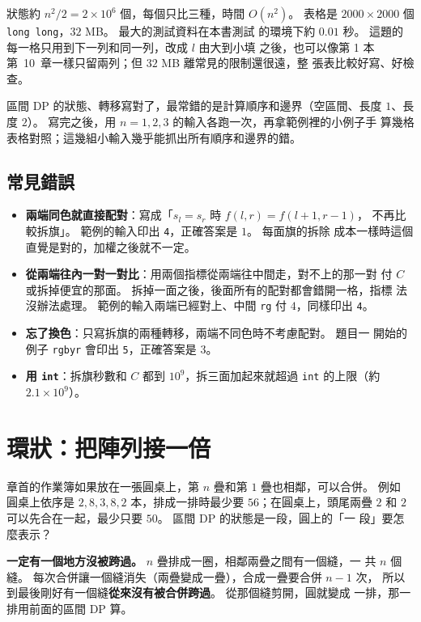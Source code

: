 狀態約 $n^2/2 = 2 \times 10^6$ 個，每個只比三種，時間 $O(n^2)$。 表格是
$2000 \times 2000$ 個 \texttt{long long}，$32$ MB。 最大的測試資料在本書測試
的環境下約 $0.01$ 秒。 這題的每一格只用到下一列和同一列，改成 $l$ 由大到小填
之後，也可以像第 1 本第~10~章一樣只留兩列；但 $32$ MB 離常見的限制還很遠，整
張表比較好寫、好檢查。

\begin{apcsnote}
區間 DP 的狀態、轉移寫對了，最常錯的是計算順序和邊界（空區間、長度 $1$、長
度 $2$）。 寫完之後，用 $n = 1, 2, 3$ 的輸入各跑一次，再拿範例裡的小例子手
算幾格表格對照；這幾組小輸入幾乎能抓出所有順序和邊界的錯。
\end{apcsnote}

\subsection{常見錯誤}

\begin{itemize}
\item \textbf{兩端同色就直接配對}：寫成「$s_l = s_r$ 時 $f(l, r) = f(l + 1, r - 1)$，
不再比較拆旗」。 範例的輸入印出 \texttt{4}，正確答案是 $1$。 每面旗的拆除
成本一樣時這個直覺是對的，加權之後就不一定。
\item \textbf{從兩端往內一對一對比}：用兩個指標從兩端往中間走，對不上的那一對
付 $C$ 或拆掉便宜的那面。 拆掉一面之後，後面所有的配對都會錯開一格，指標
法沒辦法處理。 範例的輸入兩端已經對上、中間 \texttt{rg} 付 $4$，同樣印出
\texttt{4}。
\item \textbf{忘了換色}：只寫拆旗的兩種轉移，兩端不同色時不考慮配對。 題目一
開始的例子 \texttt{rgbyr} 會印出 \texttt{5}，正確答案是 $3$。
\item \textbf{用 \texttt{int}}：拆旗秒數和 $C$ 都到 $10^9$，拆三面加起來就超過
\texttt{int} 的上限（約 $2.1 \times 10^9$）。
\end{itemize}

\section{環狀：把陣列接一倍}
\label{sec:ivdp-ring}

章首的作業簿如果放在一張圓桌上，第 $n$ 疊和第 $1$ 疊也相鄰，可以合併。 例如
圓桌上依序是 $2, 8, 3, 8, 2$ 本，排成一排時最少要 $56$；在圓桌上，頭尾兩疊
$2$ 和 $2$ 可以先合在一起，最少只要 $50$。 區間 DP 的狀態是一段，圓上的「一
段」要怎麼表示？

\textbf{一定有一個地方沒被跨過。} $n$ 疊排成一圈，相鄰兩疊之間有一個縫，一
共 $n$ 個縫。 每次合併讓一個縫消失（兩疊變成一疊），合成一疊要合併 $n - 1$ 次，
所以到最後剛好有一個縫\textbf{從來沒有被合併跨過}。 從那個縫剪開，圓就變成
一排，那一排用前面的區間 DP 算。

